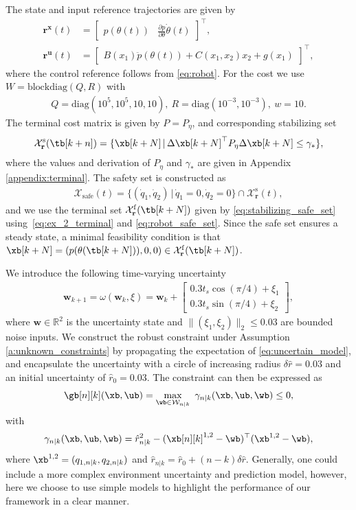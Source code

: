 \documentclass[journal]{IEEEtran}
\newcommand {\matr}[2]{\left[\begin{array}{#1}#2\end{array}\right]}
\newcommand{\x}{{\mathbf{x}}}
\renewcommand{\u}{{\mathbf{u}}}
\newcommand{\w}{{\mathbf{w}}}
\renewcommand{\r}{{\mathbf{r}}}
\newcommand{\Wb}{\mathcal{{W}}}
\begin{document}
	The state and input reference trajectories are given by
	\begin{align*}
	\r^\x(t) &= \matr{cc}{p(\theta(t))  & \frac{\partial{p}}{\partial\theta}\dot{\theta}(t)}^\top,\\
	\r^\u(t) &= \matr{c}{ B(x_{1})\ddot{p}(\theta(t))+C(x_1,x_2)x_{2}+g(x_1)}^\top,
	\end{align*}
	where the control reference follows from \eqref{eq:robot}. 
	For the cost we use $W = \mathrm{blockdiag}(Q,R)$ with
	\begin{align*}
	Q=\mathrm{diag}(10^5,10^5,10,10),\
	R=\mathrm{diag}(10^{-3},10^{-3}),\ 	w=10.
	\end{align*}
	The terminal cost matrix is given by $P=P_\eta$, and corresponding stabilizing set
	\begin{equation}\label{eq:ex_2_terminal}
	\mathcal{X}^\mathrm{s}_\r(\tb[k+n]) =\{ \xb[k+N]\, |\, \Delta\xb[k+N]^\top P_\eta\Delta\xb[k+N] \leq{} \gamma_*\},
	\end{equation}
	where the values and derivation of $P_\eta$ and $\gamma_*$ are given in Appendix \ref{appendix:terminal}. The safety set is	 constructed as
	\begin{align}
	\label{eq:robot_safe_set}
	\mathcal{X}_\mathrm{safe}(t)=\{(\dot{q}_1,\dot{q}_2)\,|\, \dot{q}_1=0,\dot{q}_2=0\} \cap \mathcal{X}_\r^\mathrm{s}(t),
	\end{align} and we use the terminal set $\mathcal{X}^\mathrm{f}_\r(\tb[k+N])$ given by \eqref{eq:stabilizing_safe_set} using~\eqref{eq:ex_2_terminal} and \eqref{eq:robot_safe_set}. 
	Since the safe set ensures a steady state, a minimal feasibility condition is that $\xb[k+N] = (p(\theta(\tb[k+N])),0,0)\in\mathcal{X}^\mathrm{f}_\r(\tb[k+N])$.
	
	We introduce the following time-varying uncertainty
	\begin{align}\label{eq:uncertain_model}
	\w_{k+1}= \omega(\w_{k},\xi) = \w_k + \matr{c}{0.3t_s\cos(\pi/4)+\xi_1\\0.3t_s\sin(\pi/4)+\xi_2},
	\end{align}
	where $\w\in\mathbb{R}^2$ is the uncertainty state and $\|(\xi_1,\xi_2)\|_2\leq{}0.03$ are bounded noise inputs. We construct the robust constraint under Assumption \ref{a:unknown_constraints} by propagating the expectation of \eqref{eq:uncertain_model}, and encapsulate the uncertainty with a circle of increasing radius $\delta{}\hat{r}=0.03$ and an initial uncertainty of $\hat{r}_0=0.03$. The constraint can then be expressed as
	\begin{align*}
	\gb[n][k](\xb,\ub) = \max_{\wb\in\Wb_{n|k}} \ \gamma_{n|k}(\xb,\ub,\wb)\leq{} 0,
	\end{align*}
	with 
	\begin{equation*}
	\gamma_{n|k}(\xb,\ub,\wb)=\hat{r}_{n|k}^2- (\xb[n][k]^{1,2}-\wb)^\top(\xb^{1,2}-\wb),
	\end{equation*}
	where $\xb^{1,2}=({q}_{1,n|k},{q}_{2,n|k})$ and $\hat{r}_{n|k}=\hat{r}_0+(n-k)\delta\hat{r}$. Generally, one could include a more complex environment uncertainty and prediction model, however, here we choose to use simple models to highlight the performance of our framework in a clear manner. 
	
\end{document}
